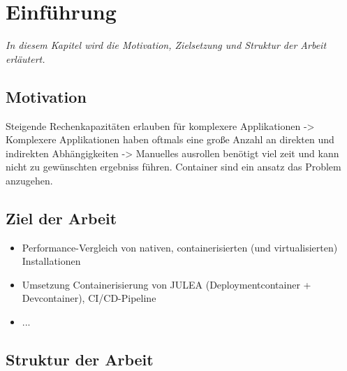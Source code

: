 \chapter{Einführung}
\label{cha:introduction}

\textit{In diesem Kapitel wird die Motivation, Zielsetzung und Struktur der Arbeit erläutert.}


\section{Motivation}

Steigende Rechenkapazitäten erlauben für komplexere Applikationen -> Komplexere Applikationen haben oftmals eine große Anzahl an direkten und indirekten Abhängigkeiten -> Manuelles ausrollen benötigt viel zeit und kann nicht zu gewünschten ergebniss führen. Container sind ein ansatz das Problem anzugehen.  

\section{Ziel der Arbeit}

\begin{itemize}
    \item Performance-Vergleich von nativen, containerisierten (und virtualisierten) Installationen
    \item Umsetzung Containerisierung von JULEA (Deploymentcontainer + Devcontainer), CI/CD-Pipeline
    \item ...
\end{itemize}

\section{Struktur der Arbeit}



